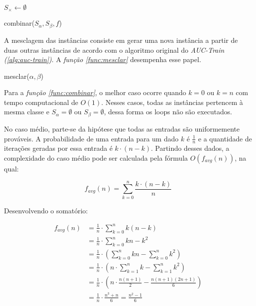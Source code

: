 \begin{function}

    $S_{\times} \gets \emptyset$



    \caption{combinar($S_{\alpha}, S_{\beta}, f$)}
    \label{func:combinar}
\end{function}

A mesclagem das instâncias consiste em gerar uma nova instância a partir de duas outras instâncias de acordo com o algoritmo original do \emph{AUC-Train (\ref{alg:auc-train})}. A \emph{função \ref{func:mesclar}} desempenha esse papel.

\begin{function}


    \caption{mesclar($\alpha, \beta$)}
    \label{func:mesclar}
\end{function}



Para a \emph{função \ref{func:combinar}}, o melhor caso ocorre quando $k = 0$ ou $k = n$ com tempo computacional de $O(1)$. Nesses casos, todas as instâncias pertencem à mesma classe e $S_{\alpha} = \emptyset$ ou $S_{\beta} = \emptyset$, dessa forma os loops não são executados.

No caso médio, parte-se da hipótese que todas as entradas são uniformemente prováveis. A probabilidade de uma entrada para um dado $k$ é $\frac{1}{n}$ e a quantidade de iterações geradas por essa entrada é $k \cdot (n - k)$. Partindo desses dados, a complexidade do caso médio pode ser calculada pela fórmula $O(f_{avg}(n))$, na qual:

\[f_{avg}(n) = \sum_{k = 0}^{n} \frac{k \cdot (n - k)}{n}\]

Desenvolvendo o somatório:

\begin{align*}
    f_{avg}(n) &= \frac{1}{n} \cdot \sum_{k = 0}^{n} k(n - k) \\
               &= \frac{1}{n} \cdot \sum_{k = 0}^{n} kn - k^2 \\
               &= \frac{1}{n} \cdot \left(\sum_{k = 0}^{n} kn - \sum_{k = 0}^{n} k^2\right) \\
               &= \frac{1}{n} \cdot \left(n \cdot \sum_{k = 1}^{n} k - \sum_{k = 1}^{n} k^2\right) \\
               &= \frac{1}{n} \cdot \left(n \cdot \frac{n(n + 1)}{2} - \frac{n(n + 1)(2n + 1)}{6}\right) \\
               &= \frac{1}{n} \cdot \frac{n^3 + n}{6} = \frac{n^2 -1}{6}
\end{align*}

